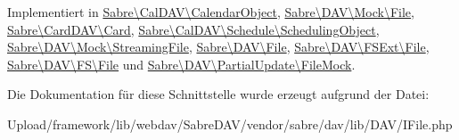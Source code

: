 Implementiert in \mbox{\hyperlink{class_sabre_1_1_cal_d_a_v_1_1_calendar_object_a54849fa5cf3916e8f108485f5ffb0851}{Sabre\textbackslash{}\+Cal\+D\+A\+V\textbackslash{}\+Calendar\+Object}}, \mbox{\hyperlink{class_sabre_1_1_d_a_v_1_1_mock_1_1_file_ab824c0a6b0467e31e5af15993713b8e9}{Sabre\textbackslash{}\+D\+A\+V\textbackslash{}\+Mock\textbackslash{}\+File}}, \mbox{\hyperlink{class_sabre_1_1_card_d_a_v_1_1_card_aa302479ba1c1d8d216331aa61ad8d8df}{Sabre\textbackslash{}\+Card\+D\+A\+V\textbackslash{}\+Card}}, \mbox{\hyperlink{class_sabre_1_1_cal_d_a_v_1_1_schedule_1_1_scheduling_object_ad133bc9b14a66ff31e11041cb1013e51}{Sabre\textbackslash{}\+Cal\+D\+A\+V\textbackslash{}\+Schedule\textbackslash{}\+Scheduling\+Object}}, \mbox{\hyperlink{class_sabre_1_1_d_a_v_1_1_mock_1_1_streaming_file_a78ce92fdea212d201f097698c0c5a1a8}{Sabre\textbackslash{}\+D\+A\+V\textbackslash{}\+Mock\textbackslash{}\+Streaming\+File}}, \mbox{\hyperlink{class_sabre_1_1_d_a_v_1_1_file_a09e6952358a011032662e1371c5aa514}{Sabre\textbackslash{}\+D\+A\+V\textbackslash{}\+File}}, \mbox{\hyperlink{class_sabre_1_1_d_a_v_1_1_f_s_ext_1_1_file_a9316801851d810c25873c2f895d6d3f5}{Sabre\textbackslash{}\+D\+A\+V\textbackslash{}\+F\+S\+Ext\textbackslash{}\+File}}, \mbox{\hyperlink{class_sabre_1_1_d_a_v_1_1_f_s_1_1_file_adad097762986bc953af13c17fdae517c}{Sabre\textbackslash{}\+D\+A\+V\textbackslash{}\+F\+S\textbackslash{}\+File}} und \mbox{\hyperlink{class_sabre_1_1_d_a_v_1_1_partial_update_1_1_file_mock_a5e51061006ed5f5ce10e514fa11ae209}{Sabre\textbackslash{}\+D\+A\+V\textbackslash{}\+Partial\+Update\textbackslash{}\+File\+Mock}}.



Die Dokumentation für diese Schnittstelle wurde erzeugt aufgrund der Datei\+:\begin{DoxyCompactItemize}
\item 
Upload/framework/lib/webdav/\+Sabre\+D\+A\+V/vendor/sabre/dav/lib/\+D\+A\+V/I\+File.\+php\end{DoxyCompactItemize}
